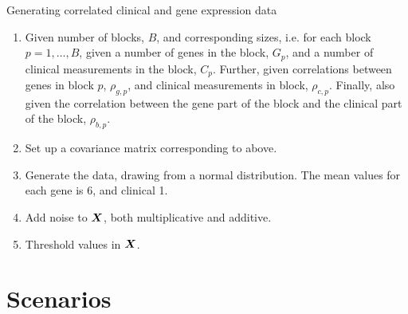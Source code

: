 \begin{algorithm}
\caption{Generating correlated clinical and gene expression data}
\label{algo:clinical-sim}
\begin{enumerate}
    \item
        Given number of blocks, $B$, and corresponding sizes, i.e. for each block $p=1,\ldots,B$, given a number of genes in the block, $G_p$, and a number of clinical measurements in the block, $C_p$.
        Further, given correlations between genes in block $p$, $\rho_{g,p}$, and clinical measurements in block, $\rho_{c,p}$.
        Finally, also given the correlation between the gene part of the block and the clinical part of the block, $\rho_{b,p}$.
    \item
        Set up a covariance matrix corresponding to above.
    \item
        Generate the data, drawing from a normal distribution.
        The mean values for each gene is 6, and clinical 1.
    \item
        Add noise to $\bm{X}$, both multiplicative and additive.
    \item
        Threshold values in $\bm{X}$.
\end{enumerate}
\end{algorithm}

\section{Scenarios}
